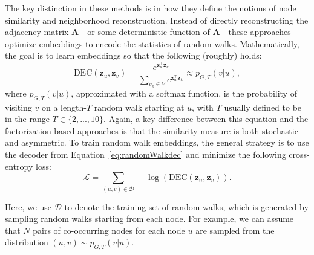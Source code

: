 The key distinction in these methods is in how they define the notions of node similarity and neighborhood reconstruction. Instead of directly reconstructing the adjacency matrix $\mathbf{A}$---or some deterministic function of $\mathbf{A}$---these approaches optimize embeddings to encode the statistics of random walks. Mathematically, the goal is to learn embeddings so that the following (roughly) holds:
\begin{equation}\label{eq:randomWalkdec}
    \text{DEC}(\mathbf{z}_u, \mathbf{z}_v) = \frac{e^{\mathbf{z}_u^\top\mathbf{z}_v}}{\sum_{v_k\in V} e^{\mathbf{z}_u^\top\mathbf{z}_k}} \approx p_{G,T}(v|u),
\end{equation}
where $p_{G,T}(v|u)$, approximated with a softmax function, is the probability of visiting $v$ on a length-$T$ random walk starting at $u$, with $T$ usually defined to be in the range $T\in\{2,...,10\}$. Again, a key difference between this equation and the factorization-based approaches is that the similarity measure is both stochastic and asymmetric.
To train random walk embeddings, the general strategy is to use the decoder from Equation~\eqref{eq:randomWalkdec} and minimize the following cross-entropy loss:
\begin{equation}\label{eq:randomWalkloss}
    \mathcal{L} = \sum_{(u,v)\in\mathcal{D}} -\log(\text{DEC}(\mathbf{z}_u, \mathbf{z}_v)).
\end{equation}

Here, we use $\mathcal{D}$ to denote the training set of random walks, which is generated by sampling random walks starting from each node. For example, we can assume that $N$ pairs of co-occurring nodes for each node $u$ are sampled from the distribution $(u,v) \sim p_{G,T}(v|u)$.

